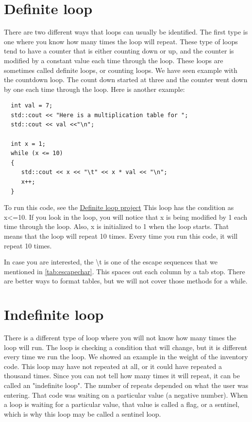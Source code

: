 \section{Definite loop}
There are two different ways that loops can usually be identified. The first type 
is one where you know how many times the loop will repeat. These type of loops tend to
have a counter that is either counting down or up, and the counter is modified by a
constant value each time through the loop. These loops are sometimes called definite loops,
or counting loops. We have seen example with the countdown loop. The count down started at
three and the counter went down by one each time through the loop. Here is another example:

\begin{lstlisting}
  int val = 7;
  std::cout << "Here is a multiplication table for ";
  std::cout << val <<"\n";
  
  int x = 1;
  while (x <= 10)
  {
     std::cout << x << "\t" << x * val << "\n";
     x++;
  }
\end{lstlisting}
To run this code, see the \href{https://replit.com/@lpatacch/definiteloop#definiteloop.cpp}{Definite loop project}
This loop has the condition as x<=10. If you look in the loop, you will notice that
x is being modified by 1 each time through the loop. Also, x is initialized to 1
when the loop starts. That means that the loop will repeat 10 times. Every time you
run this code, it will repeat 10 times.

In case you are interested, the \textbackslash t is one of the escape sequences that
we mentioned in \ref{tab:escapechar}. This spaces out each column by a tab stop. There 
are better ways to format tables, but we will not cover those methods for a while.

\section{Indefinite loop}
There is a different type of loop where you will not know how many times the loop
will run. The loop is checking a condition that will change, but it is different every
time we run the loop. We showed an example in the weight of the inventory code. This 
loop may have not repeated at all, or it could have repeated a thousand times. Since
you can not tell how many times it will repeat, it can be called an "indefinite loop". 
The number of repeats depended on what the user was entering. That code was waiting on a particular value (a negative number).
When a loop is waiting for a particular value, that value is called a flag, or a sentinel, which is why this loop may be
called a sentinel loop. 

